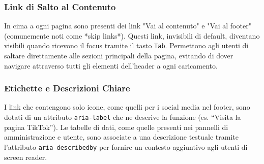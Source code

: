 \subsubsection{Link di Salto al Contenuto}
In cima a ogni pagina sono presenti dei link "Vai al contenuto" e "Vai al footer" (comunemente noti come *skip links*). Questi link, invisibili di default, diventano visibili quando ricevono il focus tramite il tasto \texttt{Tab}. Permettono agli utenti di saltare direttamente alle sezioni principali della pagina, evitando di dover navigare attraverso tutti gli elementi dell'header a ogni caricamento.

\subsubsection{Etichette e Descrizioni Chiare}
I link che contengono solo icone, come quelli per i social media nel footer, sono dotati di un attributo \texttt{aria-label} che ne descrive la funzione (es. ``Visita la pagina TikTok''). Le tabelle di dati, come quelle presenti nei pannelli di amministrazione e utente, sono associate a una descrizione testuale tramite l'attributo \texttt{aria-describedby} per fornire un contesto aggiuntivo agli utenti di screen reader.

